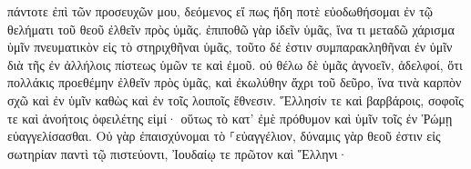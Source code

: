 \documentclass{openreader}
\begin{document}
πάντοτε ἐπὶ τῶν προσευχῶν μου, δεόμενος εἴ πως ἤδη ποτὲ εὐοδωθήσομαι ἐν τῷ θελήματι τοῦ θεοῦ ἐλθεῖν πρὸς ὑμᾶς. 
ἐπιποθῶ γὰρ ἰδεῖν ὑμᾶς, ἵνα τι μεταδῶ χάρισμα ὑμῖν πνευματικὸν εἰς τὸ στηριχθῆναι ὑμᾶς, 
τοῦτο δέ ἐστιν συμπαρακληθῆναι ἐν ὑμῖν διὰ τῆς ἐν ἀλλήλοις πίστεως ὑμῶν τε καὶ ἐμοῦ. 
οὐ θέλω δὲ ὑμᾶς ἀγνοεῖν, ἀδελφοί, ὅτι πολλάκις προεθέμην ἐλθεῖν πρὸς ὑμᾶς, καὶ ἐκωλύθην ἄχρι τοῦ δεῦρο, ἵνα τινὰ καρπὸν σχῶ καὶ ἐν ὑμῖν καθὼς καὶ ἐν τοῖς λοιποῖς ἔθνεσιν. 
Ἕλλησίν τε καὶ βαρβάροις, σοφοῖς τε καὶ ἀνοήτοις ὀφειλέτης εἰμί· 
οὕτως τὸ κατ’ ἐμὲ πρόθυμον καὶ ὑμῖν τοῖς ἐν Ῥώμῃ εὐαγγελίσασθαι. 
Οὐ γὰρ ἐπαισχύνομαι τὸ ⸀εὐαγγέλιον, δύναμις γὰρ θεοῦ ἐστιν εἰς σωτηρίαν παντὶ τῷ πιστεύοντι, Ἰουδαίῳ τε πρῶτον καὶ Ἕλληνι· 
\end{document}
